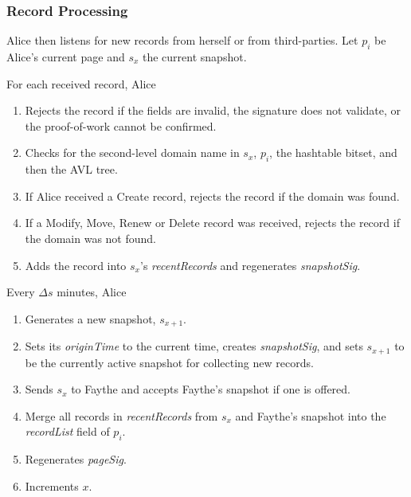 \subsubsection{Record Processing}





Alice then listens for new records from herself or from third-parties. Let $ p_{i} $ be Alice's current page and $ s_{x} $ the current snapshot.

For each received record, Alice

\begin{enumerate}
	\item Rejects the record if the fields are invalid, the signature does not validate, or the proof-of-work cannot be confirmed.
	\item Checks for the second-level domain name in $ s_{x} $, $ p_{i} $, the hashtable bitset, and then the AVL tree.
	\item If Alice received a Create record, rejects the record if the domain was found.
	\item If a Modify, Move, Renew or Delete record was received, rejects the record if the domain was not found.
	\item Adds the record into $ s_{x} $'s \emph{recentRecords} and regenerates \emph{snapshotSig}.
\end{enumerate}

Every $ \Delta s $ minutes, Alice

\begin{enumerate}
	\item Generates a new snapshot, $ s_{x+1} $.
	\item Sets its \emph{originTime} to the current time, creates \emph{snapshotSig}, and sets $ s_{x+1} $ to be the currently active snapshot for collecting new records.
	\item Sends $ s_{x} $ to Faythe and accepts Faythe's snapshot if one is offered.
	\item Merge all records in \emph{recentRecords} from $ s_{x} $ and Faythe's snapshot into the \emph{recordList} field of $ p_{i} $.
	\item Regenerates \emph{pageSig}.
	\item Increments $ x $.
\end{enumerate}

